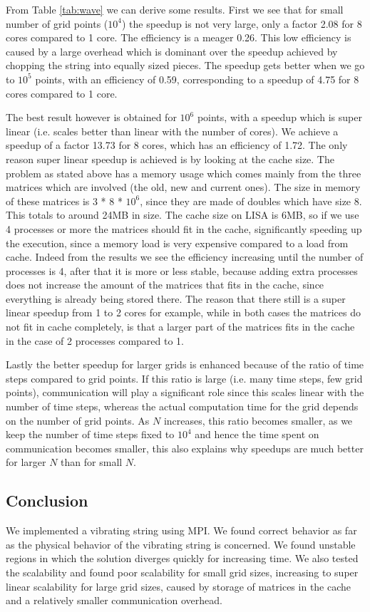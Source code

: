 \documentclass[11pt,a4paper,onecolumn]{article}
\begin{document}
From Table \ref{tab:wave} we can derive some results. First we see that for small number of grid points ($10^4$) the speedup is not very large, only a factor 2.08 for 8 cores compared to 1 core. The efficiency is a meager 0.26. This low efficiency is caused by a large overhead which is dominant over the speedup achieved by chopping the string into equally sized pieces. The speedup gets better when we go to $10^5$ points, with an efficiency of 0.59, corresponding to a speedup of 4.75 for 8 cores compared to 1 core.

The best result however is obtained for $10^6$ points, with a speedup which is super linear (i.e. scales better than linear with the number of cores). We achieve a speedup of a factor 13.73 for 8 cores, which has an efficiency of 1.72. The only reason super linear speedup is achieved is by looking at the cache size. The problem as stated above has a memory usage which comes mainly from the three matrices which are involved (the old, new and current ones). The size in memory of these matrices is 3 * 8 * $10^6$, since they are made of doubles which have size 8. This totals to around 24MB in size. The cache size on LISA is 6MB, so if we use 4 processes or more the matrices should fit in the cache, significantly speeding up the execution, since a memory load is very expensive compared to a load from cache. Indeed from the results we see the efficiency increasing until the number of processes is 4, after that it is more or less stable, because adding extra processes does not increase the amount of the matrices that fits in the cache, since everything is already being stored there. The reason that there still is a super linear speedup from 1 to 2 cores for example, while in both cases the matrices do not fit in cache completely, is that a larger part of the matrices fits in the cache in the case of 2 processes compared to 1.

Lastly the better speedup for larger grids is enhanced because of the ratio of time steps compared to grid points. If this ratio is large (i.e. many time steps, few grid points), communication will play a significant role since this scales linear with the number of time steps, whereas the actual computation time for the grid depends on the number of grid points. As $N$ increases, this ratio becomes smaller, as we keep the number of time steps fixed to $10^4$ and hence the time spent on communication becomes smaller, this also explains why speedups are much better for larger $N$ than for small $N$.

\subsection{Conclusion}
We implemented a vibrating string using MPI. We found correct behavior as far as the physical behavior of the vibrating string is concerned. We found unstable regions in which the solution diverges quickly for increasing time. We also tested the scalability and found poor scalability for small grid sizes, increasing to super linear scalability for large grid sizes, caused by storage of matrices in the cache and a relatively smaller communication overhead.
\end{document}
